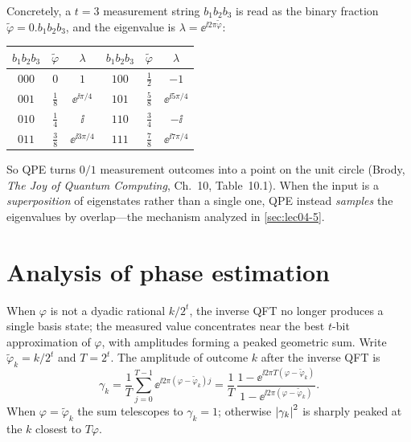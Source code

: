 \begin{remark}
\label{rem:lec04-dictionary}
Concretely, a $t=3$ measurement string $b_1b_2b_3$ is read as the binary fraction
$\tilde\varphi=0.b_1b_2b_3$, and the eigenvalue is $\lambda=\ee^{\ii 2\pi\tilde\varphi}$:
\begin{center}
\begin{tabular}{ccc@{\qquad}ccc}
\toprule
$b_1b_2b_3$ & $\tilde\varphi$ & $\lambda$ & $b_1b_2b_3$ & $\tilde\varphi$ & $\lambda$\\ \midrule
$000$ & $0$            & $1$                 & $100$ & $\tfrac12$ & $-1$\\
$001$ & $\tfrac18$     & $\ee^{\ii\pi/4}$    & $101$ & $\tfrac58$ & $\ee^{\ii 5\pi/4}$\\
$010$ & $\tfrac14$     & $\ii$               & $110$ & $\tfrac34$ & $-\ii$\\
$011$ & $\tfrac38$     & $\ee^{\ii 3\pi/4}$  & $111$ & $\tfrac78$ & $\ee^{\ii 7\pi/4}$\\ \bottomrule
\end{tabular}
\end{center}
So QPE turns $0/1$ measurement outcomes into a point on the unit circle (Brody,
\emph{The Joy of Quantum Computing}, Ch.~10, Table~10.1). When the input is a
\emph{superposition} of eigenstates rather than a single one, QPE instead
\emph{samples} the eigenvalues by overlap---the mechanism analyzed in
\cref{sec:lec04-5}.
\end{remark}

\section{Analysis of phase estimation}
\label{sec:lec04-4}

When $\varphi$ is not a dyadic rational $k/2^{t}$, the inverse QFT no longer
produces a single basis state; the measured value concentrates near the best
$t$-bit approximation of $\varphi$, with amplitudes forming a peaked geometric
sum. Write $\tilde\varphi_k=k/2^{t}$ and $T=2^{t}$. The amplitude of outcome $k$
after the inverse QFT is
\[
  \gamma_k=\frac{1}{T}\sum_{j=0}^{T-1}\ee^{\ii 2\pi(\varphi-\tilde\varphi_k)j}
          =\frac{1}{T}\,
           \frac{1-\ee^{\ii 2\pi T(\varphi-\tilde\varphi_k)}}
                {1-\ee^{\ii 2\pi(\varphi-\tilde\varphi_k)}}.
\]
When $\varphi=\tilde\varphi_k$ the sum telescopes to $\gamma_k=1$; otherwise
$\left\lvert \gamma_k \right\rvert^{2}$ is sharply peaked at the $k$ closest to $T\varphi$.

